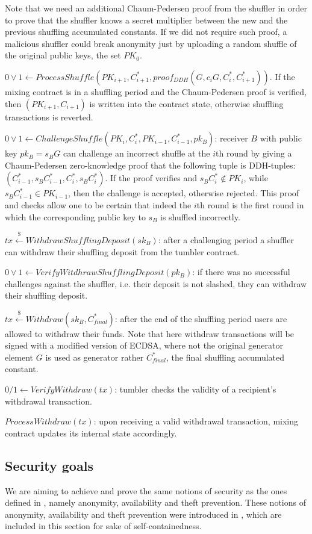 \documentclass[a4paper]{article}
\theoremstyle{definition}
\begin{document}
Note that we need an additional Chaum-Pedersen proof from the shuffler in order to prove that the shuffler knows a secret multiplier between the new and the previous shuffling accumulated constants. If we did not require such proof, a malicious shuffler could break anonymity just by uploading a random shuffle of the original public keys, the set $PK_{0}$.

 $0\lor1\leftarrow ProcessShuffle(PK_{i+1},C_{i+1}^{*},proof_{DDH}(G,c_{i}G,C^{*}_{i},C^{*}_{i+1}))$. If the mixing contract is in a shuffling period and the Chaum-Pedersen proof is verified, then $(PK_{i+1},C_{i+1})$ is written into the contract state, otherwise shuffling transactions is reverted.  

$0\lor1\leftarrow 
ChallengeShuffle(PK_{i},C^{*}_{i},PK_{i-1},C^{*}_{i-1},pk_{B})$: receiver $B$ with public key $pk_{B}=s_{B}G$ can challenge an incorrect shuffle at the $i$th round by giving a Chaum-Pedersen zero-knowledge proof that the following tuple is DDH-tuples: $(C^{*}_{i-1}, s_{B}C^{*}_{i-1}, C^{*}_{i}, s_{B}C^{*}_{i})$. If the proof verifies and $s_{B}C^{*}_{i} \notin PK_{i}$, while $s_{B}C^{*}_{i-1} \in PK_{i-1}$, then the challenge is accepted, otherwise rejected. This proof and checks allow one to be certain that indeed the $i$th round is the first round in which the corresponding public key to $s_{B}$ is shuffled incorrectly.  

$tx\stackrel{\$}{\leftarrow}WithdrawShufflingDeposit(sk_B)$: after a challenging period a shuffler can withdraw their shuffling deposit from the tumbler contract.

$0\lor1\leftarrow VerifyWitdhrawShufflingDeposit(pk_B)$: if there was no successful challenges against the shuffler, i.e. their deposit is not slashed, they can withdraw their shuffling deposit. 

$tx\stackrel{\$}{\leftarrow}Withdraw(sk_B, C^{*}_{final})$: after the end of the shuffling period users are allowed to withdraw their funds. Note that here withdraw transactions will be signed with a modified version of ECDSA, where not the original generator element $G$ is used as generator rather $C^{*}_{final}$, the final shuffling accumulated constant.

$0/1\leftarrow VerifyWithdraw(tx)$: tumbler checks the validity of a recipient's withdrawal transaction.

$ProcessWithdraw(tx)$: upon receiving a valid withdrawal transaction, mixing contract updates its internal state accordingly.

\subsection{Security goals} \label{securitygoals}
We are aiming to achieve and prove the same notions of security as the ones defined in \cite{meiklejohn2018mobius}, namely anonymity, availability and theft prevention. These notions of anonymity, availability and theft prevention were introduced in \cite{meiklejohn2018mobius}, which are included in this section for sake of self-containedness.
\end{document}
